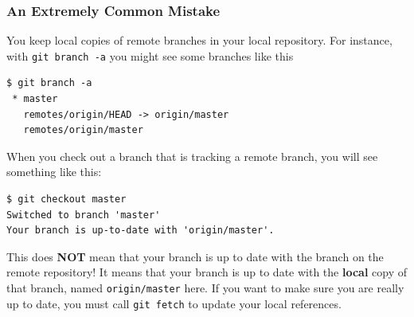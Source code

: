\begin{frame}[fragile]
\frametitle{An Extremely Common Mistake}
You keep local copies of remote branches in your local repository. For instance, with \lstinline{git branch -a} you might see some branches like this
\begin{lstlisting}
$ git branch -a
 * master
   remotes/origin/HEAD -> origin/master
   remotes/origin/master
\end{lstlisting}
When you check out a branch that is tracking a remote branch, you will see something like this:
\begin{lstlisting}
$ git checkout master
Switched to branch 'master'
Your branch is up-to-date with 'origin/master'.
\end{lstlisting}
This does \textbf{NOT} mean that your branch is up to date with the branch on the remote repository! It means that your branch is up to date with the \textbf{local} copy of that branch, named \lstinline{origin/master} here.
If you want to make sure you are really up to date, you must call \lstinline{git fetch} to update your local references.
\end{frame}

